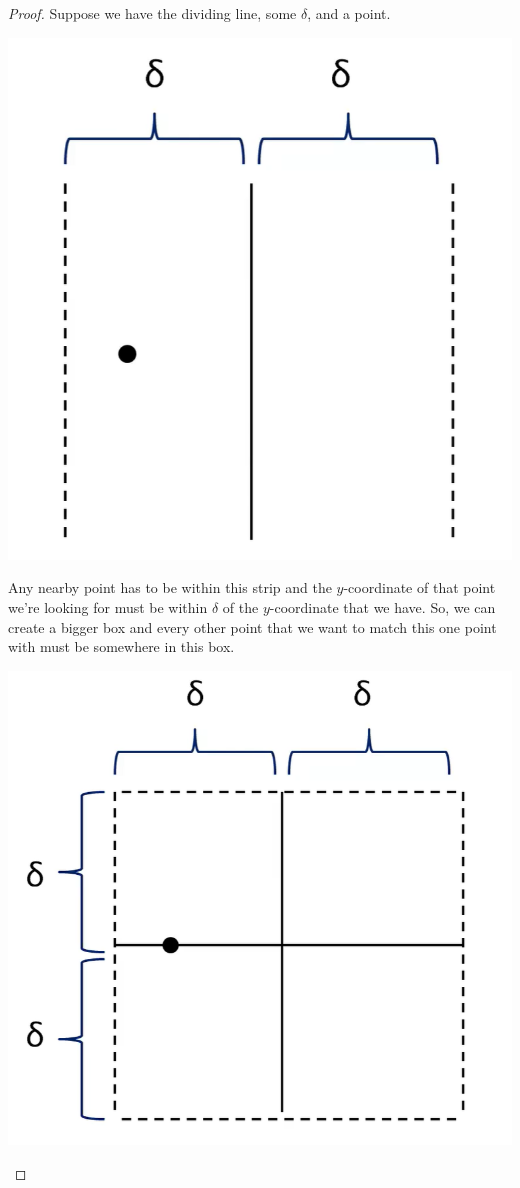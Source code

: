 \documentclass[letterpaper]{article}
\begin{document}
\begin{mdframed}[]
    \begin{proof}
        Suppose we have the dividing line, some $\delta$, and a point.
        \begin{center}
            \includegraphics[scale=0.37]{../assets/closest_proof_1.png}
        \end{center}
        Any nearby point has to be within this strip and the $y$-coordinate of that point we're looking for must be within $\delta$ of the $y$-coordinate that we have. So, we can create a bigger box and every other point that we want to match this one point with must be somewhere in this box.
        \begin{center}
            \includegraphics[scale=0.37]{../assets/closest_proof_2.png}

\end{center}
\end{proof}
\end{mdframed}
\end{document}
